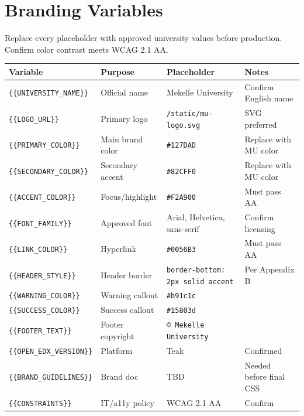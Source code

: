 \chapter{Branding Variables}

Replace every placeholder with approved university values before
production. Confirm color contrast meets WCAG 2.1 AA.

\begin{longtable}{@{}p{}p{}p{}p{}@{}}
\toprule
\textbf{Variable} & \textbf{Purpose} & \textbf{Placeholder} & \textbf{Notes} \\
\midrule
\endhead
\texttt{\{\{UNIVERSITY\_NAME\}\}} & Official name & Mekelle University & Confirm English name \\
\texttt{\{\{LOGO\_URL\}\}} & Primary logo & \texttt{/static/mu-logo.svg} & SVG preferred \\
\texttt{\{\{PRIMARY\_COLOR\}\}} & Main brand color & \texttt{\#127DAD} & Replace with MU color \\
\texttt{\{\{SECONDARY\_COLOR\}\}} & Secondary accent & \texttt{\#82CFF0} & Replace with MU color \\
\texttt{\{\{ACCENT\_COLOR\}\}} & Focus/highlight & \texttt{\#F2A900} & Must pass AA \\
\texttt{\{\{FONT\_FAMILY\}\}} & Approved font & Arial, Helvetica, sans-serif & Confirm licensing \\
\texttt{\{\{LINK\_COLOR\}\}} & Hyperlink & \texttt{\#0056B3} & Must pass AA \\
\texttt{\{\{HEADER\_STYLE\}\}} & Header border & \texttt{border-bottom: 2px solid accent} & Per Appendix B \\
\texttt{\{\{WARNING\_COLOR\}\}} & Warning callout & \texttt{\#b91c1c} & \\
\texttt{\{\{SUCCESS\_COLOR\}\}} & Success callout & \texttt{\#15803d} & \\
\texttt{\{\{FOOTER\_TEXT\}\}} & Footer copyright & \texttt{\copyright\ Mekelle University} & \\
\texttt{\{\{OPEN\_EDX\_VERSION\}\}} & Platform & Teak & Confirmed \\
\texttt{\{\{BRAND\_GUIDELINES\}\}} & Brand doc & TBD & Needed before final CSS \\
\texttt{\{\{CONSTRAINTS\}\}} & IT/a11y policy & WCAG 2.1 AA & Confirm \\
\bottomrule
\end{longtable}